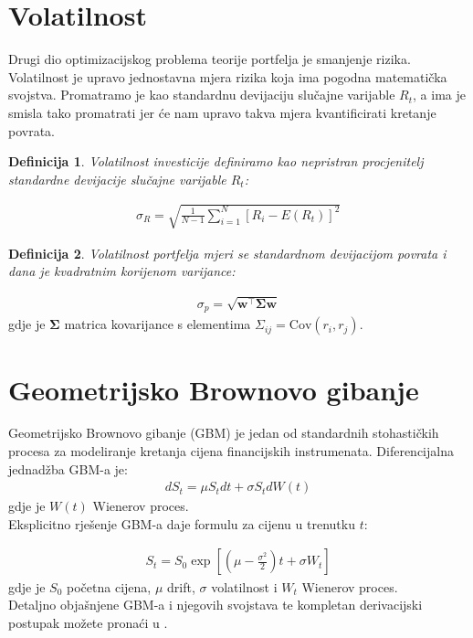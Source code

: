 \documentclass[zavrsnirad]{fer}
\newtheorem{definition}{Definicija}
\begin{document}
\section{Volatilnost}
Drugi dio optimizacijskog problema teorije portfelja je smanjenje rizika.
Volatilnost je upravo jednostavna mjera rizika koja ima pogodna matematička svojstva.
Promatramo je kao standardnu devijaciju slučajne varijable $R_t$, a ima je smisla tako promatrati
jer će nam upravo takva mjera kvantificirati kretanje povrata.
\begin{definition}
	Volatilnost investicije definiramo kao nepristran procjenitelj
	standardne devijacije slučajne varijable $R_t$:
\end{definition}
\begin{align*}
	\sigma_R = \sqrt{\frac{1}{N - 1} \sum_{i = 1}^{N} \left[R_i - E(R_t)\right]^2}
\end{align*}
\begin{definition}
Volatilnost portfelja mjeri se standardnom devijacijom povrata i dana je kvadratnim korijenom varijance:
\end{definition}
\begin{align*}
\sigma_p = \sqrt{\mathbf{w}^\intercal \boldsymbol{\Sigma} \mathbf{w}}
\end{align*}
\indent gdje je $\boldsymbol{\Sigma}$ matrica kovarijance s elementima $\Sigma_{ij} = \text{Cov}(r_i, r_j)$.

\section{Geometrijsko Brownovo gibanje}
\label{sek:gbm}
Geometrijsko Brownovo gibanje (GBM) je jedan od standardnih
stohastičkih procesa za modeliranje kretanja cijena financijskih instrumenata.
Diferencijalna jednadžba GBM-a je:
\begin{align*}
    dS_t = \mu S_t dt + \sigma S_t dW\left(t\right)
\end{align*}
\indent gdje je $W\left(t\right)$ Wienerov proces.\\
Eksplicitno rješenje GBM-a daje formulu za cijenu u trenutku $t$:

\begin{align*}
S_t = S_0 \exp\left[\left(\mu - \frac{\sigma^2}{2}\right)t +
    \sigma W_t\right]
\end{align*}
\indent gdje je $S_0$ početna cijena, $\mu$ drift, $\sigma$ volatilnost i $W_t$
Wienerov proces.\\
Detaljno objašnjene GBM-a i njegovih svojstava te kompletan derivacijski
postupak možete pronaći u \cite{GMBIzvod}.
\end{document}

